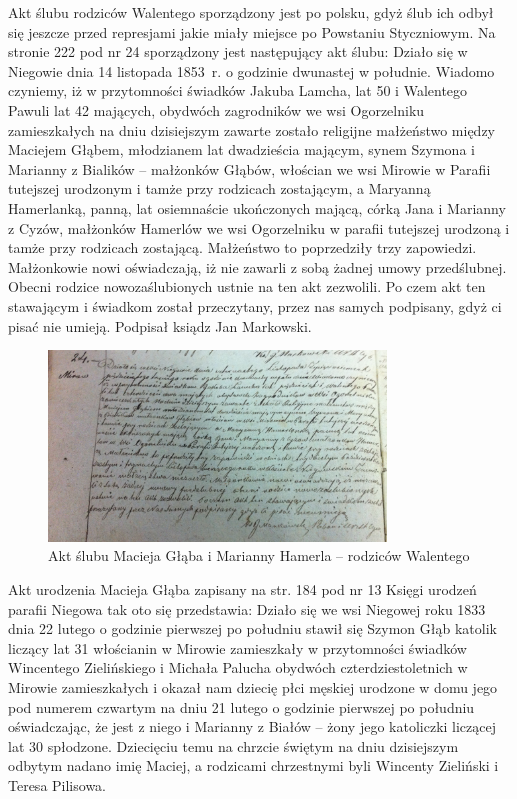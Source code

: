 Akt ślubu rodziców Walentego sporządzony jest po polsku, gdyż  ślub ich odbył się jeszcze przed represjami jakie miały miejsce po Powstaniu Styczniowym. Na stronie 222 pod nr 24 sporządzony jest następujący akt ślubu: Działo się w Niegowie dnia 14 listopada 1853~r. o godzinie dwunastej w południe. Wiadomo czyniemy, iż w przytomności świadków Jakuba Lamcha, lat 50 i Walentego Pawuli lat 42 mających, obydwóch zagrodników we wsi Ogorzelniku zamieszkałych na dniu dzisiejszym zawarte zostało religijne małżeństwo między Maciejem Głąbem, młodzianem lat dwadzieścia mającym, synem Szymona i Marianny z Bialików – małżonków Głąbów, włościan we wsi Mirowie w Parafii tutejszej urodzonym i tamże przy rodzicach zostającym, a Maryanną Hamerlanką, panną, lat osiemnaście ukończonych mającą, córką Jana i Marianny z Cyzów, małżonków Hamerlów we wsi Ogorzelniku w parafii tutejszej urodzoną i tamże przy rodzicach zostającą. Małżeństwo to poprzedziły trzy zapowiedzi. Małżonkowie nowi oświadczają, iż nie zawarli z sobą żadnej umowy przedślubnej. Obecni rodzice nowozaślubionych ustnie na ten akt zezwolili. Po czem akt ten stawającym i świadkom został przeczytany, przez nas samych podpisany, gdyż ci pisać nie umieją. Podpisał ksiądz Jan Markowski.

\begin{figure}[!h]
\begin{center}
\includegraphics[width=0.8\textwidth]{zdjecia/akt_slubu_macieja_glaba_i_marianny_hamerli.jpg}
\caption[Akt ślubu Macieja Głąba z Marianną Hamerlą]{Akt ślubu Macieja Głąba i Marianny Hamerla -- rodziców Walentego}
\label{rys:akt_slubu_macieja_glaba_i_marianny_hamerli}
\end{center}
\end{figure}

Akt urodzenia Macieja Głąba zapisany na str. 184 pod nr 13 Księgi urodzeń parafii Niegowa tak oto się przedstawia: Działo się we wsi Niegowej roku 1833 dnia 22 lutego o godzinie pierwszej po południu stawił się Szymon Głąb katolik liczący lat 31 włościanin w Mirowie zamieszkały w przytomności świadków Wincentego Zielińskiego i Michała Palucha obydwóch czterdziestoletnich w Mirowie zamieszkałych i okazał nam dziecię płci męskiej urodzone w domu jego pod numerem czwartym na dniu 21 lutego o godzinie pierwszej po południu oświadczając, że jest z niego i Marianny z Białów – żony jego katoliczki liczącej lat 30 spłodzone. Dziecięciu temu na chrzcie świętym na dniu dzisiejszym odbytym nadano imię Maciej, a rodzicami chrzestnymi byli Wincenty Zieliński i Teresa Pilisowa.

